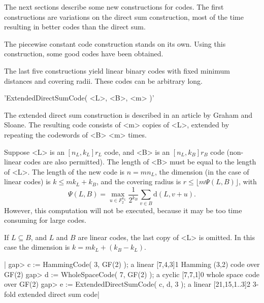   

The next sections describe some new constructions for codes.
The first constructions are variations on the direct sum
construction, most of the time resulting in better codes than
the direct sum.

The piecewise constant code construction stands on its own.
Using this construction, some good codes have been obtained.

The last five constructions yield linear binary codes with fixed
minimum distances and covering radii.
These codes can be arbitrary long.




'ExtendedDirectSumCode( <L>, <B>, <m> )'

The extended direct sum construction is described in an article
by Graham and Sloane.
The resulting code consists of <m> copies of <L>, 
extended by repeating the codewords of <B> <m> times.

Suppose <L> is an $[n_L, k_L]r_L$ code, and <B> is
an $[n_L, k_B]r_B$ code (non-linear codes are also
permitted).
The length of <B> must be equal to the length of <L>.
The length of the new code is 
$n = m n_L$, 
the dimension (in the case of linear codes) is
$k \leq m k_L + k_B$,
and the covering radius is 
$r \leq \lfloor m \Psi( L, B ) \rfloor$,
with 
\begin{equation}
	\Psi( L, B ) = \max_{u \in F_2^{n_L}} \frac{1}{2^{k_B}}
			\sum_{v \in B} \mbox{d}( L, v + u ).
\end{equation}
However, this computation will not be executed, because it
may be too time consuming for large codes.

If 
$ L \subseteq B $, and $L$ and $B$ are linear codes,
the last copy of <L> is omitted.
In this case the dimension is
$k = m k_L + ( k_B - k_L )$.

|    gap> c := HammingCode( 3, GF(2) );
    a linear [7,4,3]1 Hamming (3,2) code over GF(2)
    gap> d := WholeSpaceCode( 7, GF(2) );
    a cyclic [7,7,1]0 whole space code over GF(2)
    gap> e := ExtendedDirectSumCode( c, d, 3 );
    a linear [21,15,1..3]2 3-fold extended direct sum code|


